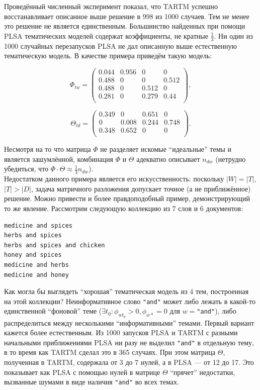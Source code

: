 Проведённый численный эксперимент показал, что TARTM успешно восстанавливает описанное выше решение в 998 из 1000 случаев. Тем не менее это решение не является единственным. Большинство найденных при помощи PLSA тематических моделей содержат коэффициенты, не кратные $\frac1{3}$. Ни один из 1000 случайных перезапусков PLSA не дал описанную выше естественную тематическую модель. В качестве примера приведём такую модель: 

\[ 
\Phi_{tw} =  
\begin{pmatrix} 
    0.044 & 0.956 & 0 & 0 \\ 
    0.488 & 0 &  0 & 0.512 \\ 
    0.488 & 0 & 0.512 & 0 \\ 
    0.281 & 0 & 0.279 & 0.44 \\ 
\end{pmatrix}, 
\] 

\[ 

\Theta_{td} =  

\begin{pmatrix} 
    0.349 & 0 & 0.651 & 0 \\ 
    0 & 0.008 & 0.244 & 0.748 \\ 
    0.348 & 0.652 & 0 & 0 \\ 
\end{pmatrix}. 

\] 

Несмотря на то что матрица $\Phi$ не разделяет искомые ``идеальные'' темы и является зашумлённой, комбинация $\Phi$ и $\Theta$ адекватно описывает $n_{dw}$ (нетрудно убедиться, что $\Phi \cdot \Theta \approx \frac{1}{3} n_{dw}$).\\ 

Недостатком данного примера является его искусственность: поскольку $|W|=|T|$, $|T|>|D|$, задача матричного разложения допускает точное (а не приближённое) решение. Можно привести и более правдоподобный пример, демонстрирующий то же явление. Рассмотрим следующую коллекцию из 7 слов и 6 документов: 

\begin{verbatim} 
medicine and spices 
herbs and spices 
herbs and spices and chicken 
honey and spices 
medicine and herbs 
medicine and honey  
\end{verbatim} 

Как могла бы выглядеть ``хорошая'' тематическая модель из 4 тем, построенная на этой коллекции? Неинформативное слово \texttt{"and"} может либо лежать в какой-то единственной ``фоновой'' теме ($\exists t_0: \phi_{wt_0} > 0, \phi_{w\ast} = 0$ для $w=$\texttt{"and"}), либо распределиться между несколькими ``информативными'' темами. Первый вариант кажется более естественным. Из 1000 запусков PLSA и TARTM с разными начальными приближениями PLSA ни разу не выделил \texttt{"and"} в отдельную тему, в то время как TARTM сделал это в 365 случаях. При этом матрица $\Theta$, полученная в TARTM, содержала от 3 до 7 нулей, а в PLSA --- от 12 до 17. Это показывает как PLSA с помощью нулей в матрице $\Theta$ ``прячет'' недостатки, вызванные шумами в виде наличия \texttt{"and"} во всех темах.  

